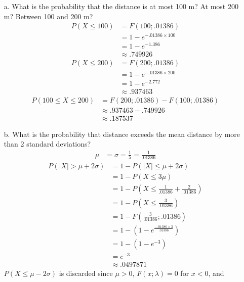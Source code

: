 \documentclass[letterpaper,12pt]{article}
\begin{document}
\begin{enumerate}
    \begin{enumerate}
      \item[a.]
        What is the probability that the distance is at most 100 m? At most 200 m? Between 100 and 200 m?
        \begin{align*}
          P(X \le 100) &= F(100; .01386) \\
          &= 1 - e^{-.01386 \times 100} \\
          &= 1 - e^{-1.386} \\
          &\approx .749926
        \end{align*}
        \begin{align*}
          P(X \le 200) &= F(200; .01386) \\
          &= 1 - e^{-.01386 \times 200} \\
          &= 1 - e^{-2.772} \\
          &\approx .937463
        \end{align*}
        \begin{align*}
          P(100 \le X \le 200) &= F(200; .01386) - F(100; .01386) \\
          &\approx .937463 - .749926 \\
          &\approx .187537
        \end{align*}
      \item[b.]
        What is the probability that distance exceeds the mean distance by more than 2 standard deviations?
        \begin{align*}
          \mu &= \sigma = \frac{1}{\lambda} = \frac{1}{.01386}
        \end{align*}
        \begin{align*}
          P(|X| > \mu + 2\sigma) &= 1 - P(|X| \le \mu + 2\sigma) \\
          &= 1 - P(X \le 3\mu) \\
          &= 1 - P\left(X \le \frac{1}{.01386} + \frac{2}{.01386}\right) \\
          &= 1 - P\left(X \le \frac{3}{.01386}\right) \\
          &= 1 - F\left(\frac{3}{.01386}; .01386\right) \\
          &= 1 - (1 - e^{\frac{-.01386 \times 3}{.01386}}) \\
          &= 1 - (1 - e^{-3}) \\
          &= e^{-3} \\
          &\approx .0497871
        \end{align*}
        $P(X \le \mu - 2\sigma)$ is discarded since $\mu > 0$, $F(x; \lambda) = 0$ for $x < 0$, and

\end{enumerate}
\end{enumerate}
\end{document}
